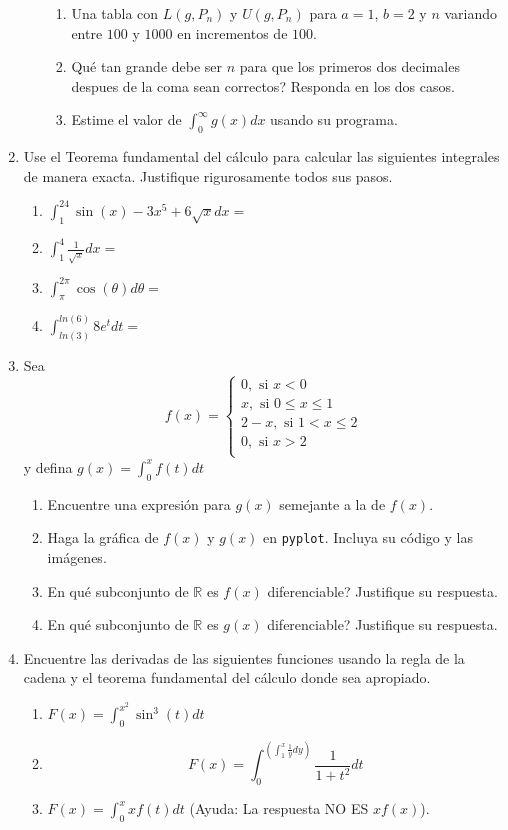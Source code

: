 \documentclass[12pt, a4paper]{article}
\begin{document}
\begin{enumerate}
\begin{enumerate}
\begin{enumerate}
\item Una tabla con $L(g,P_n)$ y $U(g,P_n)$ para $a=1$, $b=2$ y $n$ variando entre $100$ y $1000$ en incrementos de $100$.
\item Qué tan grande debe ser $n$ para que los primeros dos decimales despues de la coma sean correctos? Responda en los dos casos.
\item Estime el valor de $\int_0^{\infty} g(x)dx$ usando su programa.
\end{enumerate} 
\end{enumerate}

\item Use el Teorema fundamental del cálculo para calcular las siguientes integrales de manera exacta. Justifique rigurosamente todos sus pasos.

\begin{enumerate}
\item $\int_1^24\sin(x)-3x^5+6\sqrt{x}dx=$
\item $\int_1^4\frac{1}{\sqrt{x}}dx=$
\item $\int_\pi^{2\pi}\cos(\theta)d\theta=$
\item $\int_{ln(3)}^{ln(6)}8e^tdt=$
\end{enumerate}

\item Sea 
\[f(x)=\begin{cases}
0,\text{ si $x< 0$}\\
x,\text{ si $0\leq x\leq 1$}\\
2-x,\text{ si $1<x\leq  2$}\\
0,\text{ si $x> 2$}\\
\end{cases}\]
y defina $g(x)=\int_0^x f(t)dt$
\begin{enumerate}
\item Encuentre una expresión para $g(x)$ semejante a la de $f(x)$.
\item Haga la gráfica de $f(x)$ y $g(x)$ en \verb!pyplot!. Incluya su código y las imágenes.
\item En qué subconjunto de $\mathbb{R}$ es $f(x)$ diferenciable? Justifique su respuesta.
\item En qué subconjunto de $\mathbb{R}$ es $g(x)$ diferenciable? Justifique su respuesta. 
\end{enumerate}
\item Encuentre las derivadas de las siguientes funciones usando la regla de la cadena y el teorema fundamental del cálculo donde sea apropiado.
\begin{enumerate}
\item $F(x)=\int_0^{x^2}\sin^3(t)dt$
\item \[F(x)=\int_0^{\left(\int_1^x\frac{1}{y}dy\right)}\frac{1}{1+t^2}dt\]
\item $F(x)=\int_0^x xf(t)dt$ (Ayuda: La respuesta NO ES $xf(x)$).


\end{enumerate}
\end{enumerate}
\end{document}
